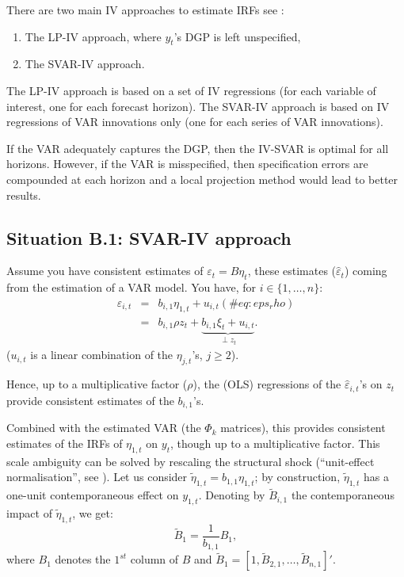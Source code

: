 \documentclass[
  12pt,
]{book}
\providecommand{\tightlist}{%
  \setlength{\itemsep}{0pt}\setlength{\parskip}{0pt}}
\theoremstyle{definition}
\theoremstyle{definition}
\theoremstyle{definition}
\theoremstyle{definition}
\theoremstyle{remark}
\begin{document}
There are two main IV approaches to estimate IRFs see \citet{Stock_Watson_2018}:

\begin{enumerate}
\def\labelenumi{\alph{enumi}.}
\tightlist
\item
  The LP-IV approach, where \(y_t\)'s DGP is left unspecified,
\item
  The SVAR-IV approach.
\end{enumerate}

The LP-IV approach is based on a set of IV regressions (for each variable of interest, one for each forecast horizon). The SVAR-IV approach is based on IV regressions of VAR innovations only (one for each series of VAR innovations).

If the VAR adequately captures the DGP, then the IV-SVAR is optimal for all horizons. However, if the VAR is misspecified, then specification errors are compounded at each horizon and a local projection method would lead to better results.

\hypertarget{situation-b.1-svar-iv-approach}{%
\subsection{Situation B.1: SVAR-IV approach}\label{situation-b.1-svar-iv-approach}}

Assume you have consistent estimates of \(\varepsilon_t = B\eta_t\), these estimates (\(\hat\varepsilon_{t}\)) coming from the estimation of a VAR model. You have, for \(i \in \{1,\dots,n\}\):
\begin{eqnarray}
\varepsilon_{i,t} &=& b_{i,1} \eta_{1,t} + u_{i,t} (\#eq:eps_rho)\\
&=& b_{i,1} \rho z_t + \underbrace{b_{i,1}\xi_t + u_{i,t}}_{\perp z_t}. \nonumber
\end{eqnarray}
(\(u_{i,t}\) is a linear combination of the \(\eta_{j,t}\)'s, \(j\ge2\)).

Hence, up to a multiplicative factor (\(\rho\)), the (OLS) regressions of the \(\hat\varepsilon_{i,t}\)'s on \(z_t\) provide consistent estimates of the \(b_{i,1}\)'s.

Combined with the estimated VAR (the \(\Phi_k\) matrices), this provides consistent estimates of the IRFs of \(\eta_{1,t}\) on \(y_t\), though up to a multiplicative factor. This scale ambiguity can be solved by rescaling the structural shock (``unit-effect normalisation'', see \citet{Stock_Watson_2018}). Let us consider \(\tilde\eta_{1,t}=b_{1,1}\eta_{1,t}\); by construction, \(\tilde\eta_{1,t}\) has a one-unit contemporaneous effect on \(y_{1,t}\). Denoting by \(\tilde{B}_{i,1}\) the contemporaneous impact of \(\tilde\eta_{1,t}\), we get:
\[
\tilde{B}_{1} = \frac{1}{b_{1,1}} {B}_{1},
\]
where \(B_{1}\) denotes the \(1^{st}\) column of \(B\) and \(\tilde{B}_{1}=[1,\tilde{B}_{2,1},\dots,\tilde{B}_{n,1}]'\).
\end{document}
